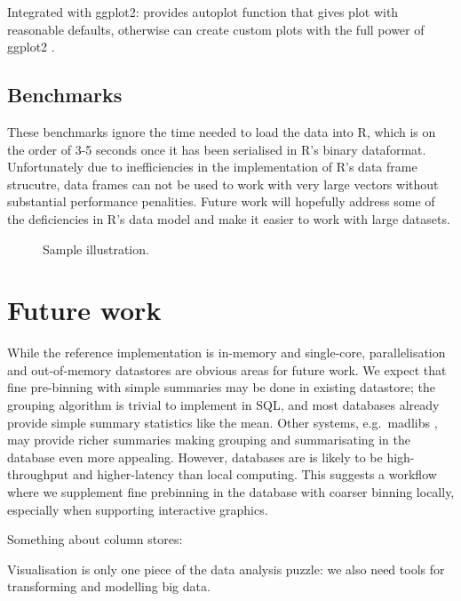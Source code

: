 \documentclass[journal]{vgtc}                %
\begin{document}
Integrated with ggplot2: provides autoplot function that gives plot with reasonable defaults, otherwise can create custom plots with the full power of ggplot2 \citep{me:ggplot2,wickham:2007d}.

\subsection{Benchmarks}
\label{sub:benchmarks}

These benchmarks ignore the time needed to load the data into R, which is on the order of 3-5 seconds once it has been serialised in R's binary dataformat.  Unfortunately due to inefficiencies in the implementation of R's data frame strucutre, data frames can not be used to work with very large vectors without substantial performance penalities. Future work will hopefully address some of the deficiencies in R's data model and make it easier to work with large datasets.


\begin{figure}[htb]
 \centering
 \caption{Sample illustration.}
\end{figure}

\section{Future work}
\label{sec:conclusion}

While the reference implementation is in-memory and single-core, parallelisation and out-of-memory datastores are obvious areas for future work. We expect that fine pre-binning with simple summaries may be done in existing datastore; the grouping algorithm is trivial to implement in SQL, and most databases already provide simple summary statistics like the mean. Other systems, e.g.\ madlibs \citep{hellerstein:2012}, may provide richer summaries making grouping and summarisating in the database even more appealing. However, databases are is likely to be high-throughput and higher-latency than local computing. This suggests a workflow where we supplement fine prebinning in the database with coarser binning locally, especially when supporting interactive graphics.

Something about column stores: \citep{kersten:2011}

Visualisation is only one piece of the data analysis puzzle: we also need tools for transforming and modelling big data. 



\newpage

\end{document}

